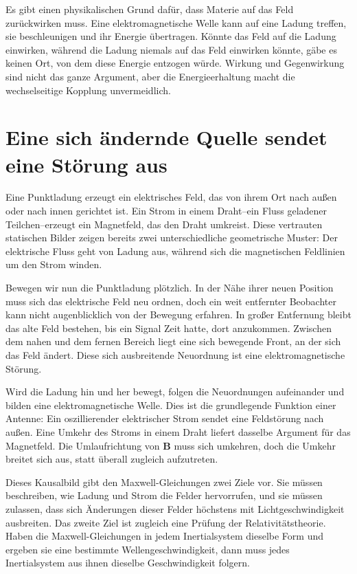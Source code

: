 Es gibt einen physikalischen Grund dafür, dass Materie auf das Feld zurückwirken muss. Eine elektromagnetische Welle kann auf eine Ladung treffen, sie beschleunigen und ihr Energie übertragen. Könnte das Feld auf die Ladung einwirken, während die Ladung niemals auf das Feld einwirken könnte, gäbe es keinen Ort, von dem diese Energie entzogen würde. Wirkung und Gegenwirkung sind nicht das ganze Argument, aber die Energieerhaltung macht die wechselseitige Kopplung unvermeidlich.

\section{Eine sich ändernde Quelle sendet eine Störung aus}

Eine Punktladung erzeugt ein elektrisches Feld, das von ihrem Ort nach außen oder nach innen gerichtet ist. Ein Strom in einem Draht--ein Fluss geladener Teilchen--erzeugt ein Magnetfeld, das den Draht umkreist. Diese vertrauten statischen Bilder zeigen bereits zwei unterschiedliche geometrische Muster: Der elektrische Fluss geht von Ladung aus, während sich die magnetischen Feldlinien um den Strom winden.

Bewegen wir nun die Punktladung plötzlich. In der Nähe ihrer neuen Position muss sich das elektrische Feld neu ordnen, doch ein weit entfernter Beobachter kann nicht augenblicklich von der Bewegung erfahren. In großer Entfernung bleibt das alte Feld bestehen, bis ein Signal Zeit hatte, dort anzukommen. Zwischen dem nahen und dem fernen Bereich liegt eine sich bewegende Front, an der sich das Feld ändert. Diese sich ausbreitende Neuordnung ist eine elektromagnetische Störung.

Wird die Ladung hin und her bewegt, folgen die Neuordnungen aufeinander und bilden eine elektromagnetische Welle. Dies ist die grundlegende Funktion einer Antenne: Ein oszillierender elektrischer Strom sendet eine Feldstörung nach außen. Eine Umkehr des Stroms in einem Draht liefert dasselbe Argument für das Magnetfeld. Die Umlaufrichtung von \(\mathbf B\) muss sich umkehren, doch die Umkehr breitet sich aus, statt überall zugleich aufzutreten.

Dieses Kausalbild gibt den Maxwell-Gleichungen zwei Ziele vor. Sie müssen beschreiben, wie Ladung und Strom die Felder hervorrufen, und sie müssen zulassen, dass sich Änderungen dieser Felder höchstens mit Lichtgeschwindigkeit ausbreiten. Das zweite Ziel ist zugleich eine Prüfung der Relativitätstheorie. Haben die Maxwell-Gleichungen in jedem Inertialsystem dieselbe Form und ergeben sie eine bestimmte Wellengeschwindigkeit, dann muss jedes Inertialsystem aus ihnen dieselbe Geschwindigkeit folgern.

